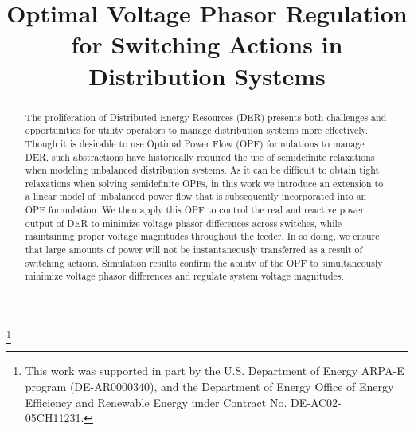 \documentclass[journal]{IEEEtran}
\begin{document}
\title{Optimal Voltage Phasor Regulation for Switching Actions in Distribution Systems}

\author{
}

\maketitle

\let\thefootnote\relax\footnote{This work was supported in part by the U.S. Department of Energy ARPA-E program (DE-AR0000340), and the Department of Energy Office of Energy Efficiency and Renewable Energy under Contract No. DE-AC02-05CH11231.}

\begin{abstract}
\noindent The proliferation of Distributed Energy Resources (DER) presents both challenges and opportunities for utility operators to manage distribution systems more effectively.  Though it is desirable to use Optimal Power Flow (OPF) formulations to manage DER, such abstractions have historically required the use of semidefinite relaxations when modeling unbalanced distribution systems.  As it can be difficult to obtain tight relaxations when solving semidefinite OPFs, in this work we introduce an extension to a linear model of unbalanced power flow that is subsequently incorporated into an OPF formulation.  We then apply this OPF to control the real and reactive power output of DER to minimize voltage phasor differences across switches, while maintaining proper voltage magnitudes throughout the feeder.  In so doing, we ensure that large amounts of power will not be instantaneously transferred as a result of switching actions.  Simulation results confirm the ability of the OPF to simultaneously minimize voltage phasor differences and regulate system voltage magnitudes.
\end{abstract}
\end{document}
